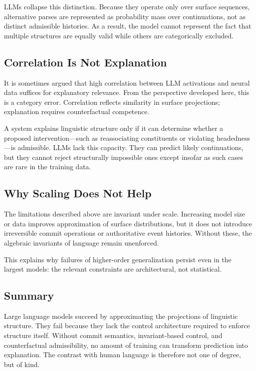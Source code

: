 \documentclass[11pt]{article}
\begin{document}
LLMs collapse this distinction. Because they operate only over surface sequences, alternative parses are represented as probability mass over continuations, not as distinct admissible histories. As a result, the model cannot represent the fact that multiple structures are equally valid while others are categorically excluded.

\subsection{Correlation Is Not Explanation}

It is sometimes argued that high correlation between LLM activations and neural data suffices for explanatory relevance. From the perspective developed here, this is a category error. Correlation reflects similarity in surface projections; explanation requires counterfactual competence.

A system explains linguistic structure only if it can determine whether a proposed intervention—such as reassociating constituents or violating headedness—is admissible. LLMs lack this capacity. They can predict likely continuations, but they cannot reject structurally impossible ones except insofar as such cases are rare in the training data.

\subsection{Why Scaling Does Not Help}

The limitations described above are invariant under scale. Increasing model size or data improves approximation of surface distributions, but it does not introduce irreversible commit operations or authoritative event histories. Without these, the algebraic invariants of language remain unenforced.

This explains why failures of higher-order generalization persist even in the largest models: the relevant constraints are architectural, not statistical.

\subsection{Summary}

Large language models succeed by approximating the projections of linguistic structure. They fail because they lack the control architecture required to enforce structure itself. Without commit semantics, invariant-based control, and counterfactual admissibility, no amount of training can transform prediction into explanation. The contrast with human language is therefore not one of degree, but of kind.
\end{document}

